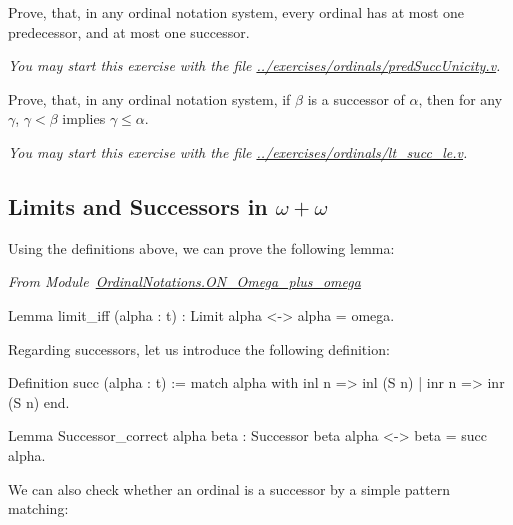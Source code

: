 \begin{exercise}
Prove, that, in any ordinal notation system, every ordinal has at most one predecessor, and at most one successor. 

\emph{You may start this exercise with the file
\url{../exercises/ordinals/predSuccUnicity.v}.}

\end{exercise}

\begin{exercise}
Prove, that, in any ordinal notation system, if $\beta$ is a successor of $\alpha$,
then for any $\gamma$, $\gamma<\beta$ implies 
$\gamma\leq\alpha$.

\emph{You may start this exercise with the file
\url{../exercises/ordinals/lt_succ_le.v}.}
\end{exercise}




\subsection{Limits and Successors in \texorpdfstring{$\omega+\omega$}{omega+omega}}

Using the definitions above, we can prove the following lemma:

\vspace{4pt}

\noindent\emph{From Module~\href{../theories/html/hydras.OrdinalNotations.ON_Omega_plus_omega.html}{OrdinalNotations.ON\_Omega\_plus\_omega}}

\begin{Coqsrc}
Lemma limit_iff (alpha : t) : Limit alpha <-> alpha = omega.
\end{Coqsrc}

Regarding successors, let us introduce the following definition:

\begin{Coqsrc}
Definition succ (alpha : t) :=
  match alpha with
    inl n => inl (S n)
  | inr n => inr (S n)
  end.
\end{Coqsrc}


\begin{Coqsrc}
Lemma Successor_correct alpha beta : Successor beta alpha <->
                                     beta = succ alpha.
\end{Coqsrc}

We can also check whether an ordinal is a successor by a simple pattern matching:

